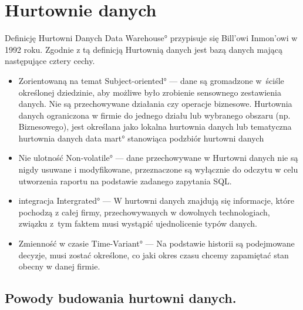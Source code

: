 \chapter{Hurtownie danych}


Definicję Hurtowni Danych \ang{Data Warehouse}  przypisuje się Bill'owi Inmon'owi w 1992 roku.
Zgodnie z tą definicją Hurtownią danych jest bazą danych mającą następujące cztery cechy. \cite{TodMan}

\begin{itemize}
 \item Zorientowaną na temat \ang{ Subject-oriented} --- 
    dane są gromadzone 
    w~ściśle określonej dziedzinie, aby możliwe było zrobienie sensownego zestawienia danych.
   Nie są przechowywane działania czy operacje biznesowe. Hurtownia danych ograniczona w firmie do jednego działu 
    lub wybranego obszaru (np. Biznesowego),
    jest określana jako lokalna hurtownia danych 
    lub tematyczna hurtownia danych \ang{data mart} stanowiąca podzbiór hurtowni danych
 \item Nie ulotność \ang{Non-volatile} --- 
    dane przechowywane w Hurtowni danych nie są nigdy usuwane i modyfikowane, 
    przeznaczone są wyłącznie do odczytu w celu utworzenia raportu na podstawie zadanego zapytania SQL.
 \item integracja \ang{Intergrated} --- W hurtowni danych znajdują się informacje, 
   które pochodzą z całej firmy, przechowywanych w dowolnych technologiach,
   związku z~tym faktem musi wystąpić ujednolicenie typów danych.

 \item Zmienność w czasie \ang{Time-Variant} --- Na podstawie historii są podejmowane decyzje, musi zostać określone,
  co jaki okres czasu chcemy zapamiętać stan obecny w danej firmie.

\end{itemize}


\section{Powody budowania hurtowni danych.}
  
